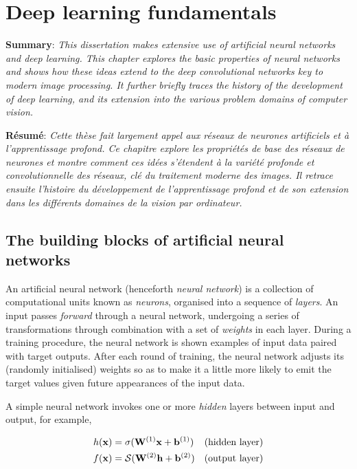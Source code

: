 
\chapter{Deep learning fundamentals} %
\label{Chapter2} %

\textbf{Summary}: \emph{This dissertation makes extensive use of artificial neural networks and deep learning. This chapter explores the basic properties of neural networks and shows how these ideas extend to the deep convolutional networks key to modern image processing. It further briefly traces the history of the development of deep learning, and its extension into the various problem domains of computer vision.}

\textbf{R\'esum\'e}: \emph{Cette th\`ese fait largement appel aux r\'eseaux de neurones artificiels et \`a l'apprentissage profond. Ce chapitre explore les propri\'et\'es de base des r\'eseaux de neurones et montre comment ces id\'ees s'\'etendent \`a la vari\'et\'e profonde et convolutionnelle des r\'eseaux, cl\'e du traitement moderne des images. Il retrace ensuite l'histoire du d\'eveloppement de l'apprentissage profond et de son extension dans les diff\'erents domaines de la vision par ordinateur.}

\section{The building blocks of artificial neural networks}
\label{sec:building_blocks_nn}

An artificial neural network (henceforth \emph{neural network}) is a collection of computational units known as \emph{neurons}, organised into a sequence of \emph{layers}. An input passes \emph{forward} through a neural network, undergoing a series of transformations through combination with a set of \emph{weights} in each layer. During a training procedure, the neural network is shown examples of input data paired with target outputs. After each round of training, the neural network adjusts its (randomly initialised) weights so as to make it a little more likely to emit the target values given future appearances of the input data.

A simple neural network invokes one or more \emph{hidden} layers between input and output, for example,

\begin{align}
h(\mathbf{x}) &= \sigma(\mathbf{W}^{(1)}\mathbf{x}  + \mathbf{b}^{(1)}) & \text{(hidden layer)} \notag \\
f(\mathbf{x}) &= \mathcal{S}(\mathbf{W}^{(2)}\mathbf{h} + \mathbf{b}^{(2)}) & \text{(output layer)}
\label{eq:simple_neural_network}
\end{align}


